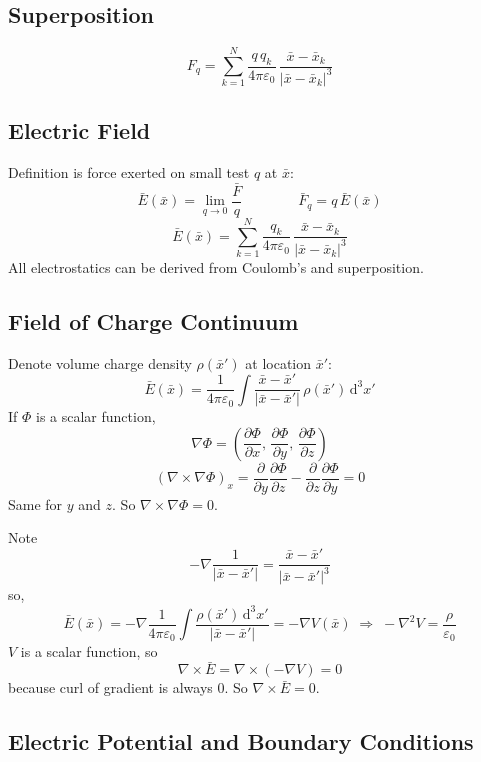 \documentclass[11pt]{article}
\newcommand{\eps}{\varepsilon_0}
\newcommand{\dd}{\,\mathrm{d}}
\begin{document}
\subsection{Superposition}

\[
  F_q = \sum_{k=1}^{N}\frac{q\,q_k}{4\pi\eps}\,\frac{\bar{x}-\bar{x}_k}{|\bar{x}-\bar{x}_k|^3}
\]

\subsection{Electric Field}

Definition is force exerted on small test $q$ at $\bar{x}$:
\[
  \bar{E}(\bar{x}) = \lim_{q\to0}\frac{\bar{F}}{q}
  \qquad\qquad
  \bar{F}_q = q\,\bar{E}(\bar{x})
\]
\[
  \bar{E}(\bar{x}) = \sum_{k=1}^{N}\frac{q_k}{4\pi\eps}\,\frac{\bar{x}-\bar{x}_k}{|\bar{x}-\bar{x}_k|^3}
\]
All electrostatics can be derived from Coulomb's and superposition.

\subsection{Field of Charge Continuum}

Denote volume charge density $\rho(\bar{x}')$ at location $\bar{x}'$:
\[
  \bar{E}(\bar{x}) = \frac{1}{4\pi\eps}\int \frac{\bar{x}-\bar{x}'}{|\bar{x}-\bar{x}'|}\,\rho(\bar{x}')\dd^3x'
\]
If $\Phi$ is a scalar function,
\[
  \nabla\Phi = \left(\frac{\partial\Phi}{\partial x},\,\frac{\partial\Phi}{\partial y},\,\frac{\partial\Phi}{\partial z}\right)
\]
\[
  (\nabla\times\nabla\Phi)_x = \frac{\partial}{\partial y}\frac{\partial\Phi}{\partial z} - \frac{\partial}{\partial z}\frac{\partial\Phi}{\partial y} = 0
\]
Same for $y$ and $z$. So $\nabla\times\nabla\Phi = 0$.

Note
\[
  -\nabla\frac{1}{|\bar{x}-\bar{x}'|} = \frac{\bar{x}-\bar{x}'}{|\bar{x}-\bar{x}'|^3}
\]
so,
\[
  \bar{E}(\bar{x}) = -\nabla\frac{1}{4\pi\eps}\int\frac{\rho(\bar{x}')\dd^3x'}{|\bar{x}-\bar{x}'|} = -\nabla V(\bar{x}) \;\Rightarrow\; -\nabla^2V = \frac{\rho}{\eps}
\]
$V$ is a scalar function, so
\[
  \nabla\times\bar{E} = \nabla\times(-\nabla V) = 0
\]
because curl of gradient is always $0$. So $\nabla\times\bar{E}=0$.

\subsection{Electric Potential and Boundary Conditions}
\end{document}
